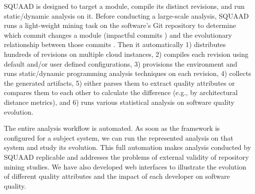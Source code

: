 
SQUAAD is designed to target a module, compile its distinct revisions, and run static/dynamic analysis on it.
Before conducting a large-scale analysis, SQUAAD runs a light-weight mining task on the software's Git repository to determine which commit changes a module (impactful commits \cite{Behnamghader2017qrs}) and the evolutionary relationship between those commits \cite{Behnamghader2018esem}.
Then it automatically
1) distributes hundreds of revisions on multiple cloud instances,
2) compiles each revision using default and/or user defined configurations,
3) provisions the environment and runs static/dynamic programming analysis techniques on each revision,
4) collects the generated artifacts,
5) either parses them to extract quality attributes or compares them to each other to calculate the difference (e.g., by architectural distance metrics), and
6) runs various statistical analysis on software quality evolution.

The entire analysis workflow is automated. As soon as the framework is configured for a subject system, we can run the represented analysis on that system and study its evolution.
This full automation makes analysis conducted by SQUAAD replicable and addresses the problems of external validity \cite{Trautsch:2016:APE:2901739.2901753} of repository mining studies.
We have also developed web interfaces to illustrate the evolution of different quality attributes and the impact of each developer on software quality.


